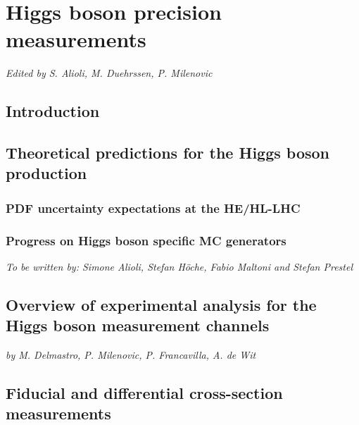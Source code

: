 \documentclass[../report.tex]{subfiles}
\providecommand{\main}{..}
\begin{document}
\section{Higgs boson precision measurements\label{sec2}}
\begin{center}{\it Edited by S. Alioli, M. Duehrssen, P. Milenovic} \end{center}
\subsection{Introduction}
\label{sec:2:introduction}


\subsection{Theoretical predictions for the Higgs boson production}
\label{sec:2_HXSWG1}


\subsubsection{PDF uncertainty expectations at the HE/HL-LHC}
\label{sec:2:PDFuncertainties}


\subsubsection{Progress on Higgs boson specific MC generators}
\begin{center} {\it To be written by: Simone Alioli, Stefan H\"oche, Fabio Maltoni and Stefan Prestel} \end{center}


\subsection{Overview of experimental analysis for the Higgs boson measurement channels}
\label{sec:2:expan}
\begin{center} {\it by M. Delmastro, P. Milenovic, P. Francavilla, A. de Wit} \end{center}
\label{sec:2:channels}


\subsection{Fiducial and differential cross-section measurements}
\label{sec:2:fiducial}

\end{document}
